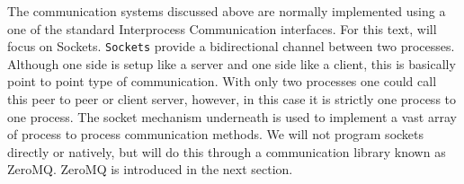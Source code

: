 The communication systems discussed above are normally implemented using
a one of the standard Interprocess Communication interfaces. For this
text, will focus on Sockets. \texttt{Sockets} provide a bidirectional
channel between two processes. Although one side is setup like a server
and one side like a client, this is basically point to point type of
communication. With only two processes one could call this peer to peer
or client server, however, in this case it is strictly one process to
one process. The socket mechanism underneath is used to implement a vast
array of process to process communication methods. We will not program
sockets directly or natively, but will do this through a communication
library known as ZeroMQ. ZeroMQ is introduced in the next section.

